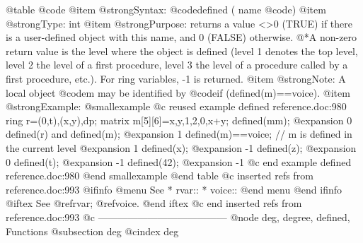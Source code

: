 @table @code
@item @strong{Syntax:}
@code{defined (} name @code{)}
@item @strong{Type:}
int
@item @strong{Purpose:}
returns a value <>0 (TRUE) if there is a user-defined object with this name,
and 0 (FALSE) otherwise.
@*A non-zero return value is the level where the object is defined (level
1 denotes the top level, level 2 the level of a first procedure, level 3
the level of a procedure called by a first procedure, etc.). For ring
variables, -1 is returned.
@item @strong{Note:}
A local object @code{m} may be identified by @code{if
(defined(m)==voice)}.
@item @strong{Example:}
@smallexample
@c reused example defined reference.doc:980 
  ring r=(0,t),(x,y),dp;
  matrix m[5][6]=x,y,1,2,0,x+y;
  defined(mm);
@expansion{} 0
  defined(r) and defined(m);
@expansion{} 1
  defined(m)==voice;   // m is defined in the current level
@expansion{} 1
  defined(x);
@expansion{} -1
  defined(z);
@expansion{} 0
  defined(t);
@expansion{} -1
  defined(42);
@expansion{} -1
@c end example defined reference.doc:980
@end smallexample
@end table
@c inserted refs from reference.doc:993
@ifinfo
@menu
See
* rvar::
* voice::
@end menu
@end ifinfo
@iftex
See
@ref{rvar};
@ref{voice}.
@end iftex
@c end inserted refs from reference.doc:993
@c ---------------------------------------
@node deg, degree, defined, Functions
@subsection deg
@cindex deg

